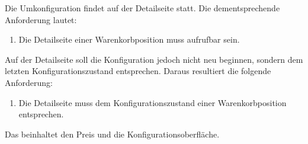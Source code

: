 \documentclass[11pt, a4paper, titlepage, listof=totoc, bibliography=totoc, index=totoc, twoside, openright, headings=normal]{scrreprt}
\begin{document}
Die Umkonfiguration findet auf der Detailseite statt. Die dementsprechende Anforderung lautet: 
\begin{enumerate}[SW.F09:]\bfseries
\item Die Detailseite einer Warenkorbposition muss aufrufbar sein.
\end{enumerate}
Auf der Detailseite soll die Konfiguration jedoch nicht neu beginnen, sondern dem letzten Konfigurationszustand entsprechen. Daraus resultiert die folgende Anforderung:
\begin{enumerate}[SW.F10:]\bfseries
\item Die Detailseite muss dem Konfigurationszustand einer Warenkorbposition entsprechen.
\end{enumerate}
Das beinhaltet den Preis und die Konfigurationsoberfläche.
\end{document}
